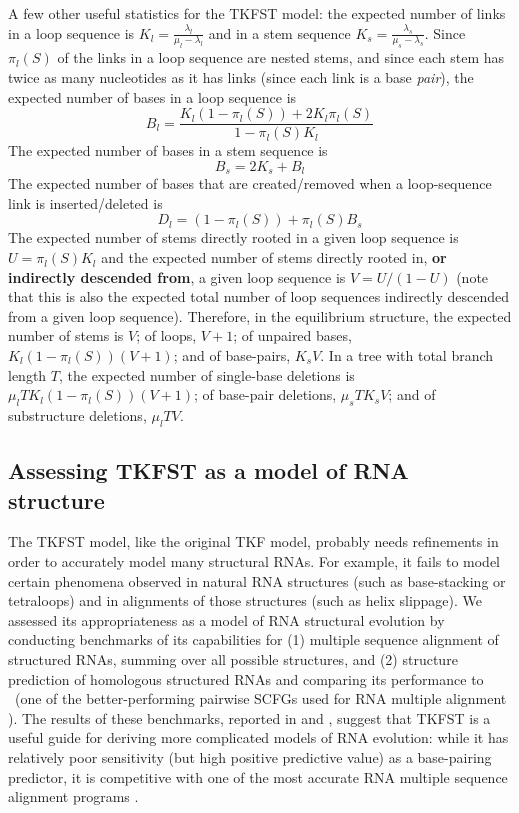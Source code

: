 \documentclass[10pt]{article}
\begin{document}
A few other useful statistics for the TKFST model:
the expected number of links in a loop sequence is $K_l = \frac{\lambda_l}{\mu_l - \lambda_l}$
and in a stem sequence $K_s = \frac{\lambda_s}{\mu_s - \lambda_s}$.
Since $\pi_l(S)$ of the links in a loop sequence are nested stems,
and since each stem has twice as many nucleotides as it has links (since each link is a base {\em pair}),
the expected number of bases in a loop sequence is
\[
B_l = \frac{K_l (1-\pi_l(S)) + 2K_l \pi_l(S)} {1 - \pi_l(S) K_l}
\]
The expected number of bases in a stem sequence is
\[
B_s = 2K_s + B_l
\]
The expected number of bases that are created/removed when a loop-sequence link is inserted/deleted is
\[
D_l = (1-\pi_l(S)) + \pi_l(S) B_s
\]
The expected number of stems directly rooted in a given loop sequence is
$U = \pi_l(S) K_l$
and the expected number of stems directly rooted in, {\bf or indirectly descended from}, a given loop sequence is
$V = U / (1 - U)$
(note that this is also the expected total number of loop sequences indirectly descended from a given loop sequence).
Therefore, in the equilibrium structure,
the expected number of stems is $V$;
of loops, $V+1$;
of unpaired bases, $K_l (1 - \pi_l(S)) (V+1)$;
and of base-pairs, $K_s V$.
In a tree with total branch length $T$,
the expected number of single-base deletions is $\mu_l T K_l (1 - \pi_l(S)) (V+1)$;
of base-pair deletions, $\mu_s T K_s V$;
and of substructure deletions, $\mu_l T V$.


\subsection*{Assessing TKFST as a model of RNA structure}

The TKFST model, like the original TKF model, probably needs
refinements in order to accurately model many structural RNAs.  For
example, it fails to model certain phenomena observed in natural
RNA structures (such as base-stacking or tetraloops) and in alignments
of those structures (such as helix slippage).
We assessed its appropriateness as a model of RNA structural evolution
by conducting benchmarks of its capabilities for (1) multiple sequence
alignment of structured RNAs, summing over all possible structures,
and (2) structure prediction of homologous structured RNAs and
comparing its performance to \stemloc\ (one of the better-performing pairwise
SCFGs used for RNA multiple alignment \cite{BradleyPachterHolmes2008}).  The
results of these benchmarks, reported in 
and , suggest that TKFST is a
useful guide for deriving more complicated models of RNA evolution:
while it has relatively poor sensitivity (but high positive predictive
value) as a base-pairing predictor, it is competitive with one of the
most accurate RNA multiple sequence alignment programs \cite{BradleyPachterHolmes2008}.
\end{document}
